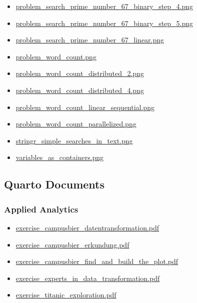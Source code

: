 \documentclass[
  letterpaper,
  DIV=11]{scrartcl}
\providecommand{\tightlist}{%
  \setlength{\itemsep}{0pt}\setlength{\parskip}{0pt}}\usepackage{longtable,booktabs,array}
\begin{document}
\begin{itemize}
\item
  \href{images/problem_search_prime_number_67_binary_step_4.png}{problem\_search\_prime\_number\_67\_binary\_step\_4.png}
\item
  \href{images/problem_search_prime_number_67_binary_step_5.png}{problem\_search\_prime\_number\_67\_binary\_step\_5.png}
\item
  \href{images/problem_search_prime_number_67_linear.png}{problem\_search\_prime\_number\_67\_linear.png}
\item
  \href{images/problem_word_count.png}{problem\_word\_count.png}
\item
  \href{images/problem_word_count_distributed_2.png}{problem\_word\_count\_distributed\_2.png}
\item
  \href{images/problem_word_count_distributed_4.png}{problem\_word\_count\_distributed\_4.png}
\item
  \href{images/problem_word_count_linear_sequential.png}{problem\_word\_count\_linear\_sequential.png}
\item
  \href{images/problem_word_count_parallelized.png}{problem\_word\_count\_parallelized.png}
\item
  \href{images/stringr_simple_searches_in_text.png}{stringr\_simple\_searches\_in\_text.png}
\item
  \href{images/variables_as_containers.png}{variables\_as\_containers.png}
\end{itemize}

\subsection{Quarto Documents}\label{quarto-documents}

\subsubsection{Applied Analytics}\label{applied-analytics-1}

\begin{itemize}
\tightlist
\item
  \href{quarto/applied_analytics/exercise_campusbier_datentransformation.pdf}{exercise\_campusbier\_datentransformation.pdf}
\item
  \href{quarto/applied_analytics/exercise_campusbier_erkundung.pdf}{exercise\_campusbier\_erkundung.pdf}
\item
  \href{quarto/applied_analytics/exercise_campusbier_find_and_build_the_plot.pdf}{exercise\_campusbier\_find\_and\_build\_the\_plot.pdf}
\item
  \href{quarto/applied_analytics/exercise_experts_in_data_transformation.pdf}{exercise\_experts\_in\_data\_transformation.pdf}
\item
  \href{quarto/applied_analytics/exercise_titanic_exploration.pdf}{exercise\_titanic\_exploration.pdf}
\end{itemize}
\end{document}
